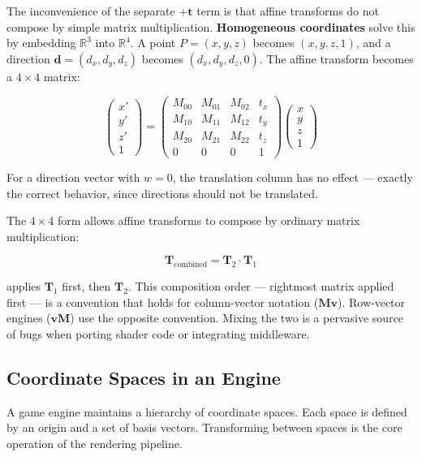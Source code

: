 \documentclass[
  11pt,
  letterpaper,
  DIV=11,
  numbers=noendperiod,
  twoside,
  open=right]{scrreprt}
\begin{document}
The inconvenience of the separate \(+\mathbf{t}\) term is that affine
transforms do not compose by simple matrix multiplication.
\textbf{Homogeneous coordinates} solve this by embedding
\(\mathbb{R}^3\) into \(\mathbb{R}^4\). A point \(P = (x, y, z)\)
becomes \((x, y, z, 1)\), and a direction
\(\mathbf{d} = (d_x, d_y, d_z)\) becomes \((d_x, d_y, d_z, 0)\). The
affine transform becomes a \(4 \times 4\) matrix:

\[
\begin{pmatrix} x' \\ y' \\ z' \\ 1 \end{pmatrix}
= \begin{pmatrix}
  M_{00} & M_{01} & M_{02} & t_x \\
  M_{10} & M_{11} & M_{12} & t_y \\
  M_{20} & M_{21} & M_{22} & t_z \\
  0 & 0 & 0 & 1
\end{pmatrix}
\begin{pmatrix} x \\ y \\ z \\ 1 \end{pmatrix}
\]

For a direction vector with \(w = 0\), the translation column has no
effect --- exactly the correct behavior, since directions should not be
translated.

The \(4 \times 4\) form allows affine transforms to compose by ordinary
matrix multiplication:

\[
\mathbf{T}_{\text{combined}} = \mathbf{T}_2 \cdot \mathbf{T}_1
\]

applies \(\mathbf{T}_1\) first, then \(\mathbf{T}_2\). This composition
order --- rightmost matrix applied first --- is a convention that holds
for column-vector notation (\(\mathbf{M}\mathbf{v}\)). Row-vector
engines (\(\mathbf{v}\mathbf{M}\)) use the opposite convention. Mixing
the two is a pervasive source of bugs when porting shader code or
integrating middleware.

\subsection{Coordinate Spaces in an
Engine}\label{coordinate-spaces-in-an-engine}

A game engine maintains a hierarchy of coordinate spaces. Each space is
defined by an origin and a set of basis vectors. Transforming between
spaces is the core operation of the rendering pipeline.
\end{document}
